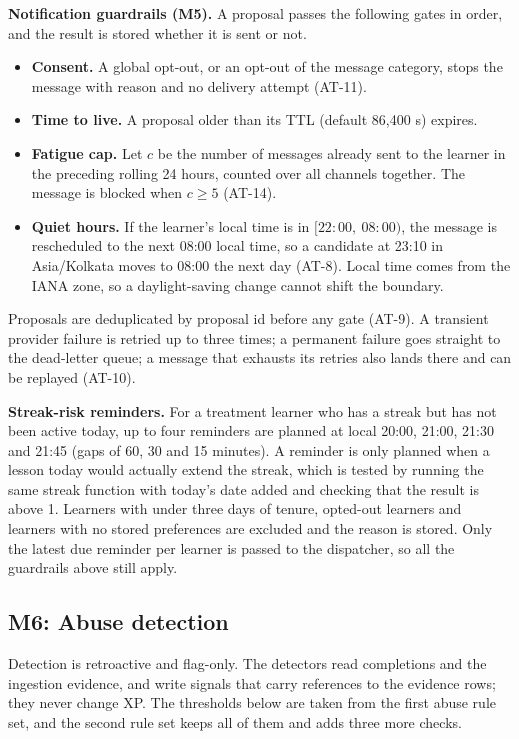 \documentclass[11pt,a4paper]{article}
\renewcommand{\_}{\textunderscore\allowbreak{}}
\begin{document}
\textbf{Notification guardrails (M5).} A proposal passes the following gates in order, and the result is stored whether it is sent or not.
\begin{itemize}
    \item \textbf{Consent.} A global opt-out, or an opt-out of the message category, stops the message with reason  and no delivery attempt (AT-11).
    \item \textbf{Time to live.} A proposal older than its TTL (default 86,400 s) expires.
    \item \textbf{Fatigue cap.} Let $c$ be the number of messages already sent to the learner in the preceding rolling 24 hours, counted over all channels together. The message is blocked when $c \ge 5$ (AT-14).
    \item \textbf{Quiet hours.} If the learner's local time is in $[22{:}00,\ 08{:}00)$, the message is rescheduled to the next 08:00 local time, so a candidate at 23:10 in Asia/Kolkata moves to 08:00 the next day (AT-8). Local time comes from the IANA zone, so a daylight-saving change cannot shift the boundary.
\end{itemize}
Proposals are deduplicated by proposal id before any gate (AT-9). A transient provider failure is retried up to three times; a permanent failure goes straight to the dead-letter queue; a message that exhausts its retries also lands there and can be replayed (AT-10).

\textbf{Streak-risk reminders.} For a treatment learner who has a streak but has not been active today, up to four reminders are planned at local 20:00, 21:00, 21:30 and 21:45 (gaps of 60, 30 and 15 minutes). A reminder is only planned when a lesson today would actually extend the streak, which is tested by running the same streak function with today's date added and checking that the result is above 1. Learners with under three days of tenure, opted-out learners and learners with no stored preferences are excluded and the reason is stored. Only the latest due reminder per learner is passed to the dispatcher, so all the guardrails above still apply.

\subsection{M6: Abuse detection}

Detection is retroactive and flag-only. The detectors read completions and the ingestion evidence, and write signals that carry references to the evidence rows; they never change XP. The thresholds below are taken from the first abuse rule set, and the second rule set keeps all of them and adds three more checks.
\end{document}
